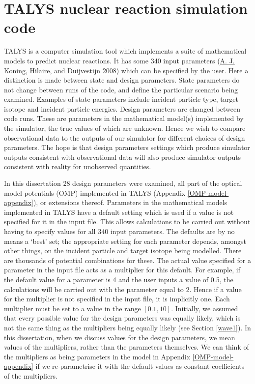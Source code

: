 \documentclass[
  12pt,
  a4paper,
  twoside]{book}
\begin{document}
\hypertarget{Background:talys}{%
\section{TALYS nuclear reaction simulation code}\label{Background:talys}}

TALYS is a computer simulation tool which implements a suite of mathematical models to predict nuclear reactions. It has some 340 input parameters (\protect\hyperlink{ref-talys}{A. J. Koning, Hilaire, and Duijvestijn 2008}) which can be specified by the user. Here a distinction is made between state and design parameters. State parameters do not change between runs of the code, and define the particular scenario being examined. Examples of state parameters include incident particle type, target isotope and incident particle energies. Design parameters are changed between code runs. These are parameters in the mathematical model(s) implemented by the simulator, the true values of which are unknown. Hence we wish to compare observational data to the outputs of our simulator for different choices of design parameters. The hope is that design parameters settings which produce simulator outputs consistent with observational data will also produce simulator outputs consistent with reality for unobserved quantities.

In this dissertation 28 design parameters were examined, all part of the optical model potentials (OMP) implemented in TALYS (Appendix \ref{OMP-model-appendix}), or extensions thereof. Parameters in the mathematical models implemented in TALYS have a default setting which is used if a value is not specified for it in the input file. This allows calculations to be carried out without having to specify values for all 340 input parameters. The defaults are by no means a `best' set; the appropriate setting for each parameter depends, amongst other things, on the incident particle and target isotope being modelled. There are thousands of potential combinations for these. The actual value specified for a parameter in the input file acts as a multiplier for this default. For example, if the default value for a parameter is 4 and the user inputs a value of 0.5, the calculations will be carried out with the parameter equal to 2. Hence if a value for the multiplier is not specified in the input file, it is implicitly one. Each multiplier must be set to a value in the range \([0.1,10]\). Initially, we assumed that every possible value for the design parameters was equally likely, which is not the same thing as the multipliers being equally likely (see Section \ref{wave1}). In this dissertation, when we discuss values for the design parameters, we mean values of the multipliers, rather than the parameters themselves. We can think of the multipliers as being parameters in the model in Appendix \ref{OMP-model-appendix} if we re-parametrise it with the default values as constant coefficients of the multipliers.
\end{document}
